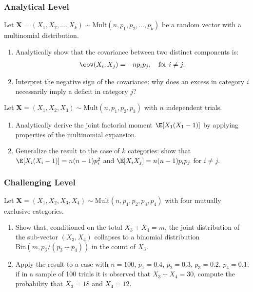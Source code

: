 \subsubsection*{Analytical Level}

\begin{problema}
	\label{prob:3.8.7}
	Let $\bm{X} = (X_{1}, X_{2}, \dots, X_{k}) \sim \text{Mult}(n, p_{1}, p_{2}, \dots, p_{k})$ be a random vector with a multinomial distribution.
	\begin{enumerate}
		\item Analytically show that the covariance between two distinct components is:
		\begin{align*}
			\cov(X_{i}, X_{j}) = -n p_{i} p_{j}, \quad \text{for } i \neq j.
		\end{align*}
		\item Interpret the negative sign of the covariance: why does an excess in category $i$ necessarily imply a deficit in category $j$?
	\end{enumerate}
\end{problema}

\begin{problema}
	\label{prob:3.8.8}
	Let $\bm{X} = (X_{1}, X_{2}, X_{3}) \sim \text{Mult}(n, p_{1}, p_{2}, p_{3})$ with $n$ independent trials.
	\begin{enumerate}
		\item Analytically derive the joint factorial moment $\E[X_{1}(X_{1}-1)]$ by applying properties of the multinomial expansion.
		\item Generalize the result to the case of $k$ categories: show that $\E[X_{i}(X_{i}-1)] = n(n-1)p_{i}^{2}$ and $\E[X_{i} X_{j}] = n(n-1)p_{i} p_{j}$ for $i \neq j$.
	\end{enumerate}
\end{problema}

\subsubsection*{Challenging Level}

\begin{problema}
	\label{prob:3.8.9}
	Let $\bm{X} = (X_{1}, X_{2}, X_{3}, X_{4}) \sim \text{Mult}(n, p_{1}, p_{2}, p_{3}, p_{4})$ with four mutually exclusive categories.
	\begin{enumerate}
		\item Show that, conditioned on the total $X_{3} + X_{4} = m$, the joint distribution of the sub-vector $(X_{3}, X_{4})$ collapses to a binomial distribution $\text{Bin}(m, p_{3}/(p_{3} + p_{4}))$ in the count of $X_{3}$.
		\item Apply the result to a case with $n = 100$, $p_{1} = 0.4$, $p_{2} = 0.3$, $p_{3} = 0.2$, $p_{4} = 0.1$: if in a sample of 100 trials it is observed that $X_{3} + X_{4} = 30$, compute the probability that $X_{3} = 18$ and $X_{4} = 12$.
	\end{enumerate}
\end{problema}

